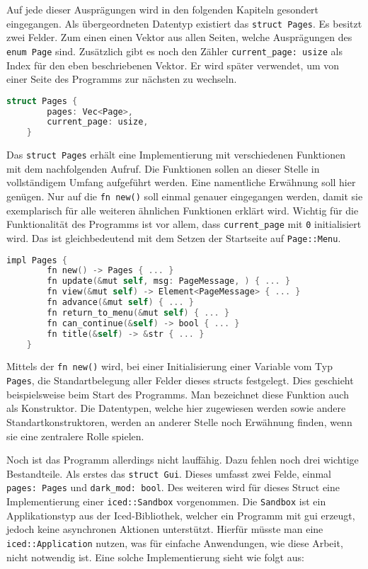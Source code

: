 Auf jede dieser Ausprägungen wird in den folgenden Kapiteln gesondert eingegangen.
Als übergeordneten Datentyp existiert das \lstinline{struct Pages}. 
Es besitzt zwei Felder. Zum einen einen Vektor aus allen Seiten, welche Ausprägungen des \lstinline{enum Page} sind.
Zusätzlich gibt es noch den Zähler  \lstinline{current_page: usize} als Index für den eben beschriebenen Vektor. Er wird später verwendet, um
von einer Seite des Programms zur nächsten zu wechseln.

\begin{lstlisting}[language=C]
    struct Pages {
        pages: Vec<Page>,
        current_page: usize,
    }
\end{lstlisting}

Das \lstinline{struct Pages} erhält eine Implementierung mit verschiedenen Funktionen mit dem nachfolgenden Aufruf.
Die Funktionen sollen an dieser Stelle in vollständigem Umfang aufgeführt werden. Eine namentliche Erwähnung soll hier genügen. 
Nur auf die \lstinline{fn new()} soll einmal genauer eingegangen werden, damit sie exemplarisch für alle weiteren ähnlichen Funktionen erklärt wird.
Wichtig für die Funktionalität des Programms ist vor allem, dass \lstinline{current_page} mit \lstinline{0} initialisiert wird. Das ist gleichbedeutend mit dem Setzen der 
Startseite auf \lstinline{Page::Menu}.

\begin{lstlisting}[language=C]
    impl Pages {
        fn new() -> Pages { ... }
        fn update(&mut self, msg: PageMessage, ) { ... }
        fn view(&mut self) -> Element<PageMessage> { ... }
        fn advance(&mut self) { ... }
        fn return_to_menu(&mut self) { ... }
        fn can_continue(&self) -> bool { ... }
        fn title(&self) -> &str { ... }
    }
\end{lstlisting}

Mittels der \lstinline{fn new()} wird, bei einer Initialisierung einer Variable vom Typ \lstinline{Pages}, die Standartbelegung aller Felder dieses structs festgelegt. 
Dies geschieht beispielsweise beim Start des Programms. Man bezeichnet diese Funktion auch als Konstruktor. Die Datentypen, welche hier zugewiesen werden sowie andere Standartkonstruktoren,
werden an anderer Stelle noch Erwähnung finden, wenn sie eine zentralere Rolle spielen.

Noch ist das Programm allerdings nicht lauffähig. Dazu fehlen noch drei wichtige Bestandteile. Als erstes das \lstinline{struct Gui}. Dieses umfasst zwei Felde, einmal 
\lstinline{pages: Pages} und \lstinline{dark_mod: bool}. Des weiteren wird für dieses Struct eine Implementierung einer \lstinline{iced::Sandbox} vorgenommen.
Die \lstinline{Sandbox} ist ein Applikationstyp aus der Iced-Bibliothek, welcher ein Programm mit \ac{gui} erzeugt, jedoch keine asynchronen Aktionen unterstützt. Hierfür müsste man
eine \lstinline{iced::Application} nutzen, was für einfache Anwendungen, wie diese Arbeit, nicht notwendig ist. Eine solche Implementierung sieht wie folgt aus:

